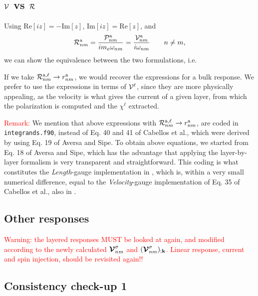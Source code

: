 \subsection{${\mathbf{\cal V}}$ vs ${\cal R}$}

Using 
$\mathrm{Re}[iz]=-\mathrm{Im}[z]$,
$\mathrm{Im}[iz]=\mathrm{Re}[z]$,
and
\begin{equation}\label{rnmenm91}
{\cal R}^{\mathrm{a}}_{nm}=\frac{{\cal P}^{\mathrm{a}}_{nm}}{im_e\omega_{nm}}=\frac{{\mathbf{\cal V}}^{\mathrm{a}}_{nm}}{i\omega_{nm}}
\quad\quad n\ne m
,
\end{equation}
we can show the equivalence between the two formulations, i.e.

\noindent If we take ${\cal R}^{\mathrm{a},\ell}_{nm}\to r^{\mathrm{a}}_{nm}$, 
we
would recover the expressions for a bulk response.
We prefer to use the expressions in terms of ${\mathbf{\cal V}}^\ell$, since they are
more physically appealing, as the velocity is what gives the current
of a given layer, from which the polarization is computed and the
$\chi^\ell$ extracted.   

\textcolor{red}{Remark:} We mention that above expressions with 
${\cal R}^{\mathrm{a},\ell}_{nm}\to r^{\mathrm{a}}_{nm}$, are coded in
\verb=integrands.f90=, instead of Eq. 40 and 41 of Cabellos et
al.\cite{cabellosPRB09}, which were derived by using Eq. 19 of Aversa
and Sipe.\cite{aversaPRB95} To obtain above equations, we started
from Eq. 18 of Aversa and Sipe,\cite{aversaPRB95} which has the
advantage that applying the layer-by-layer formalism is very
transparent and straightforward. This coding is what constitutes the
{\it Length}-gauge implementation in \tiniba, which is, within a very
small numerical difference, equal to the {\it Velocity}-gauge
implementation of Eq. 35 of Cabellos et al.\cite{cabellosPRB09}, also
in \tiniba. 

\subsection{Other responses}

\textcolor{red}{Warning: the layered responses MUST be looked at
  again, and modified according to the newly calculated 
$\boldsymbol{\mathcal{\cal V}}^\sigma_{nm}$  and
$(\boldsymbol{\mathcal{\cal V}}^\sigma_{nm})_{;\mathbf{k}}$. Linear response, current and
spin injection, should be revisited again!!}
 
\subsection{Consistency check-up 1}

